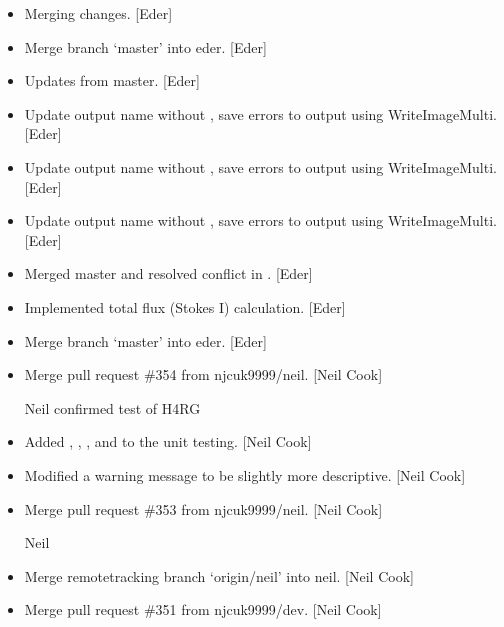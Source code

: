 \documentclass[a4paper,10pt,english]{report}
\begin{document}
\begin{itemize}
\item {} 
Merging changes. {[}Eder{]}

\item {} 
Merge branch ‘master’ into eder. {[}Eder{]}

\item {} 
Updates from master. {[}Eder{]}

\item {} 
Update output name without , save errors to output using
WriteImageMulti. {[}Eder{]}

\item {} 
Update output name without , save errors to output using
WriteImageMulti. {[}Eder{]}

\item {} 
Update output name without , save errors to output using
WriteImageMulti. {[}Eder{]}

\item {} 
Merged master and resolved conflict in . {[}Eder{]}

\item {} 
Implemented total flux (Stokes I) calculation. {[}Eder{]}

\item {} 
Merge branch ‘master’ into eder. {[}Eder{]}

\item {} 
Merge pull request \#354 from njcuk9999/neil. {[}Neil Cook{]}

Neil \sphinxhyphen{} confirmed test of H4RG

\item {} 
Added , , ,  and 
to the unit testing. {[}Neil Cook{]}

\item {} 
Modified a warning message to be slightly more descriptive. {[}Neil
Cook{]}

\item {} 
Merge pull request \#353 from njcuk9999/neil. {[}Neil Cook{]}

Neil

\item {} 
Merge remote\sphinxhyphen{}tracking branch ‘origin/neil’ into neil. {[}Neil Cook{]}

\item {} 
Merge pull request \#351 from njcuk9999/dev. {[}Neil Cook{]}


\end{itemize}
\end{document}

